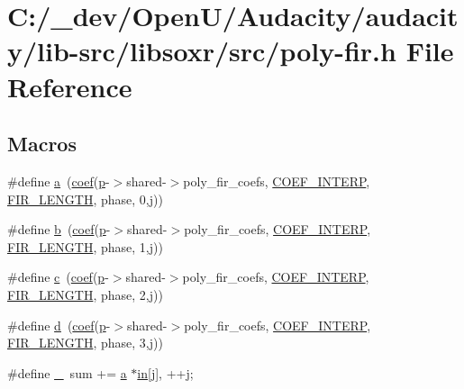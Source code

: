 \hypertarget{poly-fir_8h}{}\section{C\+:/\+\_\+dev/\+Open\+U/\+Audacity/audacity/lib-\/src/libsoxr/src/poly-\/fir.h File Reference}
\label{poly-fir_8h}
\subsection*{Macros}
\begin{DoxyCompactItemize}
\item 
\#define \hyperlink{poly-fir_8h_a8d3c3518d793541417a4845125da1ae1}{a}~(\hyperlink{vr32_8c_abb25177205d56e90a9770f6b4c57c07f}{coef}(\hyperlink{xmltok_8h_a94b60f3beb36ae85555d36dc9816769c}{p}-\/$>$shared-\/$>$poly\+\_\+fir\+\_\+coefs, \hyperlink{filters_8h_a5db01676189e0b8c747e25147f9d5a09}{C\+O\+E\+F\+\_\+\+I\+N\+T\+E\+RP}, \hyperlink{filters_8h_ab0faf18f9519fa3535f35aa0062247b8}{F\+I\+R\+\_\+\+L\+E\+N\+G\+TH}, phase, 0,j))
\item 
\#define \hyperlink{poly-fir_8h_ab2d05693952610f937e5acb3c4a8fa1b}{b}~(\hyperlink{vr32_8c_abb25177205d56e90a9770f6b4c57c07f}{coef}(\hyperlink{xmltok_8h_a94b60f3beb36ae85555d36dc9816769c}{p}-\/$>$shared-\/$>$poly\+\_\+fir\+\_\+coefs, \hyperlink{filters_8h_a5db01676189e0b8c747e25147f9d5a09}{C\+O\+E\+F\+\_\+\+I\+N\+T\+E\+RP}, \hyperlink{filters_8h_ab0faf18f9519fa3535f35aa0062247b8}{F\+I\+R\+\_\+\+L\+E\+N\+G\+TH}, phase, 1,j))
\item 
\#define \hyperlink{poly-fir_8h_aafc737ea9ef91f59cf9acd287fb8d085}{c}~(\hyperlink{vr32_8c_abb25177205d56e90a9770f6b4c57c07f}{coef}(\hyperlink{xmltok_8h_a94b60f3beb36ae85555d36dc9816769c}{p}-\/$>$shared-\/$>$poly\+\_\+fir\+\_\+coefs, \hyperlink{filters_8h_a5db01676189e0b8c747e25147f9d5a09}{C\+O\+E\+F\+\_\+\+I\+N\+T\+E\+RP}, \hyperlink{filters_8h_ab0faf18f9519fa3535f35aa0062247b8}{F\+I\+R\+\_\+\+L\+E\+N\+G\+TH}, phase, 2,j))
\item 
\#define \hyperlink{poly-fir_8h_a2530554172d8629149ec56816eeaa947}{d}~(\hyperlink{vr32_8c_abb25177205d56e90a9770f6b4c57c07f}{coef}(\hyperlink{xmltok_8h_a94b60f3beb36ae85555d36dc9816769c}{p}-\/$>$shared-\/$>$poly\+\_\+fir\+\_\+coefs, \hyperlink{filters_8h_a5db01676189e0b8c747e25147f9d5a09}{C\+O\+E\+F\+\_\+\+I\+N\+T\+E\+RP}, \hyperlink{filters_8h_ab0faf18f9519fa3535f35aa0062247b8}{F\+I\+R\+\_\+\+L\+E\+N\+G\+TH}, phase, 3,j))
\item 
\#define \hyperlink{poly-fir_8h_ae4dfd7b0d66121016d6466d2ff10e8ba}{\+\_\+}~sum += \hyperlink{rfft2d_test_m_l_8m_a4124bc0a9335c27f086f24ba207a4912}{a} $\ast$\hyperlink{latency_8c_a7d946209d777cb95fe30364b8d321207}{in}\mbox{[}j\mbox{]}, ++j;
\end{DoxyCompactItemize}


